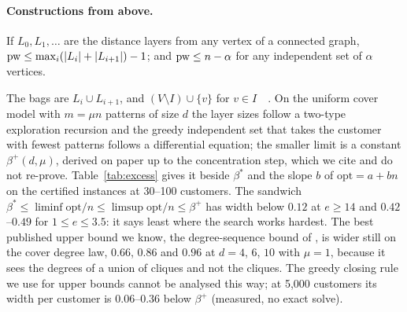 \paragraph{Constructions from above.}
\begin{lemma}[layers]
\label{lem:layer}
If $L_0,L_1,\dots$ are the distance layers from any vertex of a connected
graph, $\mathrm{pw}\le\max_i(|L_i|+|L_{i+1}|)-1$; and $\mathrm{pw}\le n-\alpha$ for any
independent set of $\alpha$ vertices.
\end{lemma}
The bags are $L_i\cup L_{i+1}$, and $(V\setminus I)\cup\{v\}$ for $v\in
I$~~. On the uniform cover model with $m=\mu n$
patterns of size $d$ the layer sizes follow a two-type exploration recursion
and the greedy independent set that takes the customer with fewest patterns
follows a differential equation; the smaller limit is a constant
$\beta^{+}(d,\mu)$, derived on paper up to the concentration step, which we
cite and do not re-prove. Table~\ref{tab:excess} gives it beside $\beta^{*}$
and the slope $b$ of $\mathrm{opt}=a+bn$ on the certified instances at
30--100 customers. The sandwich
$\beta^{*}\le\liminf\mathrm{opt}/n\le\limsup\mathrm{opt}/n\le\beta^{+}$ has
width below $0.12$ at $e\ge14$ and $0.42$--$0.49$ for $1\le e\le3.5$: it says
least where the search works hardest. The best published upper bound we know,
the degree-sequence bound of \citet[Corollary~5.2]{EdwardsMcDermid2015}, is
wider still on the cover degree law, $0.66$, $0.86$ and $0.96$ at $d=4$, $6$,
$10$ with $\mu=1$, because it sees the degrees of a union of cliques and not
the cliques. The greedy closing rule we use for
upper bounds cannot be analysed this way; at 5,000 customers its width per
customer is $0.06$--$0.36$ below $\beta^{+}$ (measured, no exact solve).

\begin{table}[htbp]
\centering
\caption{Random covers with $m=n$ patterns of $d$ customers: the excess, the
first-moment constant (a proved lower bound on $\liminf\mathrm{opt}/n$), the
slope $b$ of $\mathrm{opt}=a+bn$ on 600--625 certified instances at 30--100
customers (measured; one standard error in parentheses), and the constant of
the analysed layouts (an upper bound on $\limsup\mathrm{opt}/n$, on paper up
to concentration).}
\label{tab:excess}
\small

\end{table}

